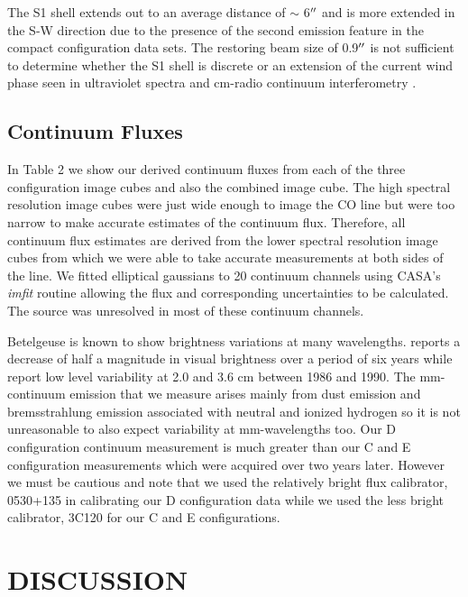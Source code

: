 \documentclass[preprint2]{aastex}
\begin{document}
The S1 shell extends out to an average distance of $\sim$ 6$\mbox{$^{\prime\prime}$}$ and is more extended in the S-W direction due to the presence of the second emission feature in the compact configuration data sets. The restoring beam size of 0.9$\mbox{$^{\prime\prime}$}$ is not sufficient to determine whether the S1 shell is discrete or an extension of the current wind phase seen in ultraviolet spectra \citep{1997ApJ...479..970C} and cm-radio continuum interferometry \citep{1998Natur.392..575L, harper_2001}.

\subsection{Continuum Fluxes} \label{results4} 

In Table 2 we show our derived continuum fluxes from each of the three configuration image cubes and also the combined image cube. The high spectral resolution image cubes were just wide enough to image the CO line but were too narrow to make accurate estimates of the continuum flux. Therefore, all continuum flux estimates are derived from the lower spectral resolution image cubes from which we were able to take accurate measurements at both sides of the line. We fitted elliptical gaussians to 20 continuum channels using CASA's \textit{imfit} routine allowing the flux and corresponding uncertainties to be calculated. The source was unresolved in most of these continuum channels. 

Betelgeuse is known to show brightness variations at many wavelengths. \cite{1984PASP...96..366G} reports a decrease of half a magnitude in visual brightness over a period of six years while \cite{1986AJ.....91..602D} report low level variability at 2.0 and 3.6 cm between 1986 and 1990. The mm-continuum emission that we measure arises mainly from dust emission and bremsstrahlung emission associated with neutral and ionized hydrogen so it is not unreasonable to also expect variability at mm-wavelengths too. Our D configuration continuum measurement is much greater than our C and E configuration measurements which were acquired over two years later. However we must be cautious and note that we used the relatively bright flux calibrator, 0530+135 in calibrating our D configuration data while we used the less bright calibrator, 3C120 for our C and E configurations.

\section{DISCUSSION}
\end{document}
